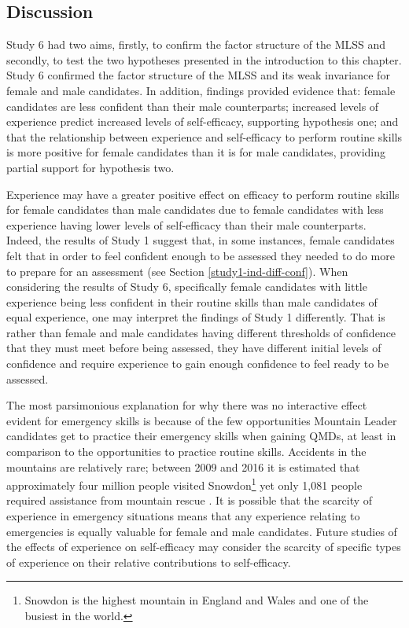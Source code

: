\documentclass[
  12pt,
  a4paper,
]{book}
\begin{document}
\hypertarget{study-6-discussion}{%
\subsection{Discussion}\label{study-6-discussion}}

Study 6 had two aims, firstly, to confirm the factor structure of the MLSS and secondly, to test the two hypotheses presented in the introduction to this chapter. Study 6 confirmed the factor structure of the MLSS and its weak invariance for female and male candidates. In addition, findings provided evidence that: female candidates are less confident than their male counterparts; increased levels of experience predict increased levels of self-efficacy, supporting hypothesis one; and that the relationship between experience and self-efficacy to perform routine skills is more positive for female candidates than it is for male candidates, providing partial support for hypothesis two.

Experience may have a greater positive effect on efficacy to perform routine skills for female candidates than male candidates due to female candidates with less experience having lower levels of self-efficacy than their male counterparts. Indeed, the results of Study 1 suggest that, in some instances, female candidates felt that in order to feel confident enough to be assessed they needed to do more to prepare for an assessment (see Section \ref{study1-ind-diff-conf}). When considering the results of Study 6, specifically female candidates with little experience being less confident in their routine skills than male candidates of equal experience, one may interpret the findings of Study 1 differently. That is rather than female and male candidates having different thresholds of confidence that they must meet before being assessed, they have different initial levels of confidence and require experience to gain enough confidence to feel ready to be assessed.

The most parsimonious explanation for why there was no interactive effect evident for emergency skills is because of the few opportunities Mountain Leader candidates get to practice their emergency skills when gaining QMDs, at least in comparison to the opportunities to practice routine skills. Accidents in the mountains are relatively rare; between 2009 and 2016 it is estimated that approximately four million people visited Snowdon\footnote{Snowdon is the highest mountain in England and Wales and one of the busiest in the world.} yet only 1,081 people required assistance from mountain rescue \citep[i.e., \textless{} 0.01\% of visitors;][]{SNPA2017}. It is possible that the scarcity of experience in emergency situations means that any experience relating to emergencies is equally valuable for female and male candidates. Future studies of the effects of experience on self-efficacy may consider the scarcity of specific types of experience on their relative contributions to self-efficacy.
\end{document}
